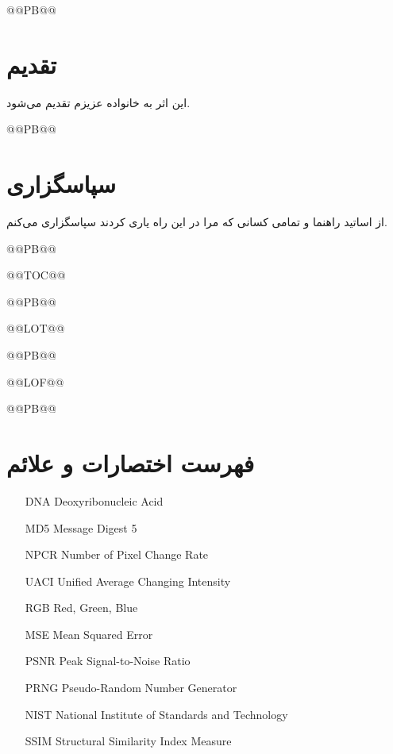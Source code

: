 @@PB@@

\chapter*{تقدیم}
این اثر به خانواده عزیزم تقدیم می‌شود.


@@PB@@

\chapter*{سپاسگزاری}
از اساتید راهنما و تمامی کسانی که مرا در این راه یاری کردند سپاسگزاری می‌کنم.


@@PB@@




@@TOC@@




@@PB@@




@@LOT@@




@@PB@@




@@LOF@@





@@PB@@

\chapter*{فهرست اختصارات و علائم}

\begin{itemize}
    \item[DNA] Deoxyribonucleic Acid
    \item[MD5] Message Digest 5
    \item[NPCR] Number of Pixel Change Rate
    \item[UACI] Unified Average Changing Intensity
    \item[RGB] Red, Green, Blue
    \item[MSE] Mean Squared Error
    \item[PSNR] Peak Signal-to-Noise Ratio
    \item[PRNG] Pseudo-Random Number Generator
    \item[NIST] National Institute of Standards and Technology
    \item[SSIM] Structural Similarity Index Measure
\end{itemize}



